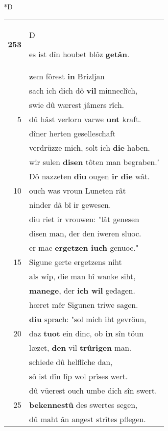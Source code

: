 \documentclass[8pt,a4paper,notitlepage]{article}
\begin{document}
\begin{table}[ht]
\begin{minipage}[t]{0.5\linewidth}
\small
\begin{center}*D
\end{center}
\begin{tabular}{rl}
\textbf{253} & \begin{large}D\end{large}es ist dîn houbet blôz \textbf{getân}.\\ 
 & \textbf{z}em fôrest \textbf{in} Brizljan\\ 
 & sach ich dich dô \textbf{vil} minneclîch,\\ 
 & swie dû wærest jâmers rîch.\\ 
5 & dû hâst verlorn varwe \textbf{unt} kraft.\\ 
 & dîner herten geselleschaft\\ 
 & verdrüzze mich, solt ich \textbf{die} haben.\\ 
 & wir sulen \textbf{disen} tôten man begraben."\\ 
 & Dô nazzeten \textbf{diu} ougen \textbf{ir die} wât.\\ 
10 & ouch was vroun Luneten rât\\ 
 & ninder dâ bî ir gewesen.\\ 
 & diu riet ir vrouwen: "lât genesen\\ 
 & disen man, der den iweren sluoc.\\ 
 & er mac \textbf{ergetzen iuch} genuoc."\\ 
15 & Sigune gerte ergetzens niht\\ 
 & als wîp, die man bî wanke siht,\\ 
 & \textbf{manege}, der \textbf{ich wil} gedagen.\\ 
 & hœret mêr Sigunen triwe sagen.\\ 
 & \textbf{diu} sprach: "sol mich iht gevröun,\\ 
20 & daz \textbf{tuot} ein dinc, ob \textbf{in} sîn töun\\ 
 & læzet, \textbf{den} vil \textbf{trûrigen} man.\\ 
 & schiede dû helflîche dan,\\ 
 & sô ist dîn lîp wol prîses wert.\\ 
 & dû vüerest ouch umbe dich sîn swert.\\ 
25 & \textbf{bekennestû} des swertes segen,\\ 
 & dû maht ân angest strîtes pflegen.\\ 

\end{tabular}
\end{minipage}
\end{table}
\end{document}

